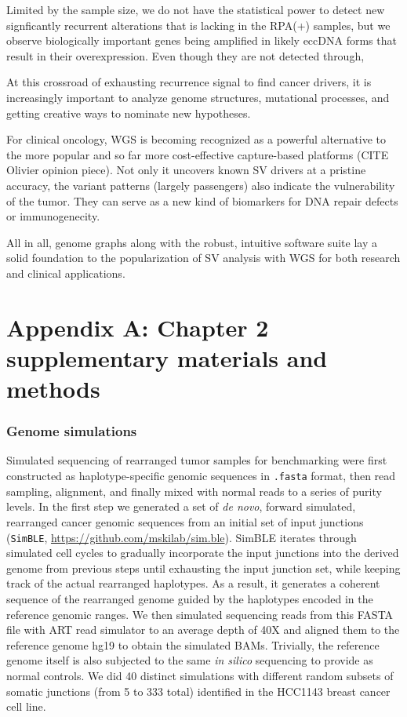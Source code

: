 \documentclass[phd,tocprelim]{cornell}
\newcommand{\ttt}[1]{\texttt{#1}}
\begin{document}
Limited by the sample size, we do not have the statistical power to detect new signficantly recurrent alterations that is lacking in the RPA(+) samples, but we observe biologically important genes being amplified in likely eccDNA forms that result in their overexpression. Even though they are not detected through, 

At this crossroad of exhausting recurrence signal to find cancer drivers, it is increasingly important to analyze genome structures, mutational processes, and getting creative ways to nominate new hypotheses.

For clinical oncology, WGS is becoming recognized as a powerful alternative to the more popular and so far more cost-effective capture-based platforms (CITE Olivier opinion piece). Not only it uncovers known SV drivers at a pristine accuracy, the variant patterns (largely passengers) also indicate the vulnerability of the tumor. They can serve as a new kind of biomarkers for DNA repair defects or immunogenecity.

All in all, genome graphs along with the robust, intuitive software suite lay a solid foundation to the popularization of SV analysis with WGS for both research and clinical applications.

\appendix

\chapter*{Appendix A: Chapter 2 supplementary materials and methods} \label{app:a}
\subsection*{Genome simulations}
Simulated sequencing of rearranged tumor samples for benchmarking were first constructed as haplotype-specific genomic sequences in \ttt{.fasta} format, then read sampling, alignment, and finally mixed with normal reads to a series of purity levels. In the first step we generated a set of \textit{de novo}, forward simulated, rearranged cancer genomic sequences from an initial set of input junctions (\texttt{SimBLE}, \url{https://github.com/mskilab/sim.ble}). SimBLE iterates through simulated cell cycles to gradually incorporate the input junctions into the derived genome from previous steps until exhausting the input junction set, while keeping track of the actual rearranged haplotypes. As a result, it generates a coherent sequence of the rearranged genome guided by the haplotypes encoded in the reference genomic ranges. We then simulated sequencing reads from this FASTA file with ART read simulator \cite{Huang2012-zn} to an average depth of 40X and aligned them to the reference genome hg19 to obtain the simulated BAMs. Trivially, the reference genome itself is also subjected to the same \textit{in silico} sequencing to provide as normal controls. We did 40 distinct simulations with different random subsets of somatic junctions (from 5 to 333 total) identified in the HCC1143 breast cancer cell line. 
\end{document}
